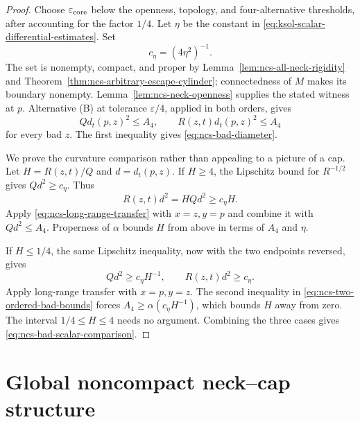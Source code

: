 \documentclass[10pt]{coll-l}
\theoremstyle{definition}
\theoremstyle{remark}
\numberwithin{section}{chapter}
\numberwithin{equation}{chapter}
\begin{document}
\begin{proof}
Choose $\varepsilon_{\rm core}$ below the openness, topology, and
four-alternative thresholds, after accounting for the factor $1/4$.
Let $\eta$ be the constant in
\eqref{eq:ksol-scalar-differential-estimates}.  Set
\begin{equation}
                         c_\eta=(4\eta^2)^{-1}.         \label{eq:ncs-scalar-ratio-constant}
\end{equation}
The set is nonempty, compact, and proper by
Lemma~\ref{lem:ncs-all-neck-rigidity} and
Theorem~\ref{thm:ncs-arbitrary-escape-cylinder}; connectedness of $M$
makes its boundary nonempty.  Lemma~\ref{lem:ncs-neck-openness} supplies
the stated witness at $p$.  Alternative (B) at tolerance
$\varepsilon/4$, applied in both orders, gives
\begin{equation}
 Qd_t(p,z)^2\leq A_4,\qquad
 R(z,t)d_t(p,z)^2\leq A_4                              \label{eq:ncs-two-ordered-bad-bounds}
\end{equation}
for every bad $z$.  The first inequality gives
\eqref{eq:ncs-bad-diameter}.

We prove the curvature comparison rather than appealing to a picture of a
cap.  Let $H=R(z,t)/Q$ and $d=d_t(p,z)$.  If $H\geq4$, the Lipschitz
bound for $R^{-1/2}$ gives $Qd^2\geq c_\eta$.  Thus
\begin{equation}
 R(z,t)d^2=H Qd^2\geq c_\eta H.
\end{equation}
Apply \eqref{eq:ncs-long-range-transfer} with $x=z,y=p$ and combine it
with $Qd^2\leq A_4$.  Properness of $\alpha$ bounds $H$ from above in terms
of $A_4$ and $\eta$.

If $H\leq1/4$, the same Lipschitz inequality, now with the two endpoints
reversed, gives
\begin{equation}
 Qd^2\geq c_\eta H^{-1},\qquad R(z,t)d^2\geq c_\eta.
\end{equation}
Apply long-range transfer with $x=p,y=z$.  The second inequality in
\eqref{eq:ncs-two-ordered-bad-bounds} forces
$A_4\geq\alpha(c_\eta H^{-1})$, which bounds $H$ away from zero.
The interval $1/4\leq H\leq4$ needs no argument.  Combining the three
cases gives \eqref{eq:ncs-bad-scalar-comparison}.
\end{proof}

\section{Global noncompact neck--cap structure}
\label{sec:ncs-global-structure}
\end{document}
